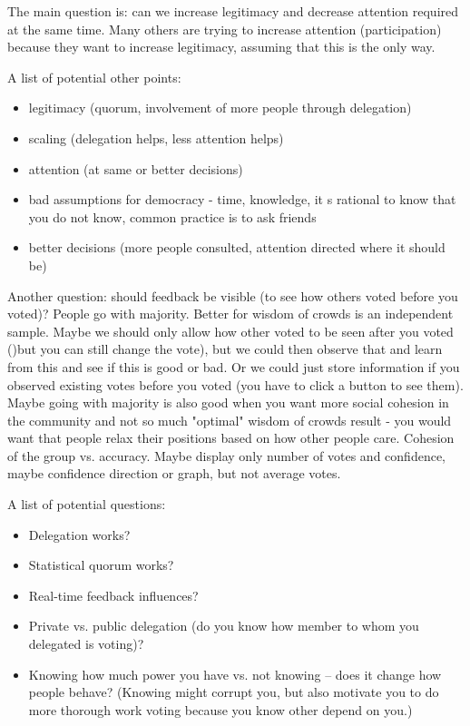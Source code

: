 \documentclass{sigchi}
\begin{document}
The main question is: can we increase legitimacy and decrease attention required at the same time.
Many others are trying to increase attention (participation) because they want to increase legitimacy,
assuming that this is the only way.

A list of potential other points:
\begin{itemize}
\item legitimacy (quorum, involvement of more people through delegation)
\item scaling (delegation helps, less attention helps)
\item attention (at same or better decisions)
\item bad assumptions for democracy - time, knowledge, it s rational to know that you do not know, common practice is to ask friends
\item better decisions (more people consulted, attention directed where it should be)
\end{itemize}

Another question: should feedback be visible (to see how others voted before you voted)?
People go with majority.
Better for wisdom of crowds is an independent sample.
Maybe we should only allow how other voted to be seen after you voted ()but you can still change the vote),
but we could then observe that and learn from this and see if this is good or bad.
Or we could just store information if you observed existing votes before you voted (you have to click a button to see them).
Maybe going with majority is also good when you want more social cohesion in the community and not so much "optimal"
wisdom of crowds result -  you would want that people relax their positions based on how other people care.
Cohesion of the group vs. accuracy.
Maybe display only number of votes and confidence, maybe confidence direction or graph, but not average votes.

A list of potential questions:
\begin{itemize}
\item Delegation works?
\item Statistical quorum works?
\item Real-time feedback influences?
\item Private vs. public delegation (do you know how member to whom you delegated is voting)?
\item Knowing how much power you have vs. not knowing -- does it change how people behave? (Knowing might corrupt you, but also motivate you to do more thorough work voting because you know other depend on you.)
\end{itemize}
\end{document}
